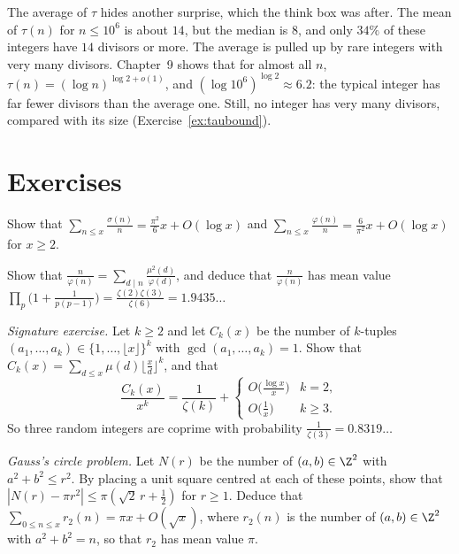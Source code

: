 The average of $\tau$ hides another surprise, which the think box was after. The mean of $\tau(n)$ for $n\le10^6$ is about $14$, but
the median is $8$, and only $34\%$ of these integers have $14$ divisors or more. The average is pulled up by rare integers with very
many divisors. Chapter~9 shows that for almost all $n$, $\tau(n)=(\log n)^{\log2+o(1)}$, and $(\log10^6)^{\log2}\approx6.2$: the typical
integer has far fewer divisors than the average one. Still, no integer has very many divisors, compared with its size
(Exercise~\ref{ex:taubound}).

\section{Exercises}

\begin{exercise}[$\star$]\label{ex:sigmaovern}
Show that $\sum_{n\le x}\frac{\sigma(n)}n=\frac{\pi^2}6x+O(\log x)$ and $\sum_{n\le x}\frac{\varphi(n)}n=\frac6{\pi^2}x+O(\log x)$ for $x\ge2$.
\end{exercise}

\begin{exercise}[$\star\star$]\label{ex:nphi}
Show that $\frac n{\varphi(n)}=\sum_{d\mid n}\frac{\mu^2(d)}{\varphi(d)}$, and deduce that $\frac n{\varphi(n)}$ has mean value
$\prod_p\bigl(1+\frac1{p(p-1)}\bigr)=\frac{\zeta(2)\zeta(3)}{\zeta(6)}=1.9435\ldots$
\end{exercise}

\begin{exercise}[$\star\star$]\label{ex:coprimek}
\emph{Signature exercise.} Let $k\ge2$ and let $C_k(x)$ be the number of $k$-tuples $(a_1,\dots,a_k)\in\{1,\dots,\lfloor x\rfloor\}^k$ with
$\gcd(a_1,\dots,a_k)=1$. Show that $C_k(x)=\sum_{d\le x}\mu(d)\lfloor\frac xd\rfloor^k$, and that
\[
\frac{C_k(x)}{x^k}=\frac1{\zeta(k)}+\begin{cases}O\bigl(\frac{\log x}x\bigr)&k=2,\\O\bigl(\frac1x\bigr)&k\ge3.\end{cases}
\]
So three random integers are coprime with probability $\frac1{\zeta(3)}=0.8319\ldots$
\end{exercise}

\begin{exercise}[$\star\star$]\label{ex:circle}
\emph{Gauss's circle problem.} Let $N(r)$ be the number of $(a,b)\in\Z^2$ with $a^2+b^2\le r^2$. By placing a unit square centred at each
of these points, show that $|N(r)-\pi r^2|\le\pi(\sqrt2\,r+\frac12)$ for $r\ge1$. Deduce that $\sum_{0\le n\le x}r_2(n)=\pi x+O(\sqrt x)$, where $r_2(n)$
is the number of $(a,b)\in\Z^2$ with $a^2+b^2=n$, so that $r_2$ has mean value $\pi$.
\end{exercise}

